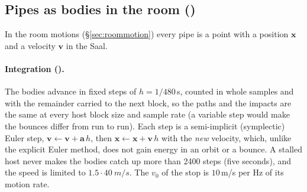\subsection{Pipes as bodies in the room ()}
\label{sec:math-bodies}
In the room motions (\S\ref{sec:roommotion}) every pipe is a point with a position $\mathbf x$ and a velocity $\mathbf v$
in the Saal.

\paragraph{Integration ().} The bodies advance in fixed steps of $h = 1/480$\,s, counted in whole samples
and with the remainder carried to the next block, so the paths and the impacts are the same at every host block size
and sample rate (a variable step would make the bounces differ from run to run). Each step is a semi-implicit
(symplectic) Euler step, $\mathbf v \leftarrow \mathbf v + \mathbf a\,h$, then $\mathbf x \leftarrow \mathbf x + \mathbf v\,h$
with the \emph{new} velocity, which, unlike the explicit Euler method, does not gain energy in an orbit or a bounce. A
stalled host never makes the bodies catch up more than 2400 steps (five seconds), and the speed is limited to
$1.5\cdot\SI{40}{m/s}$. The  $v_0$ of the stop is $10$\,m/s per Hz of its motion rate.

